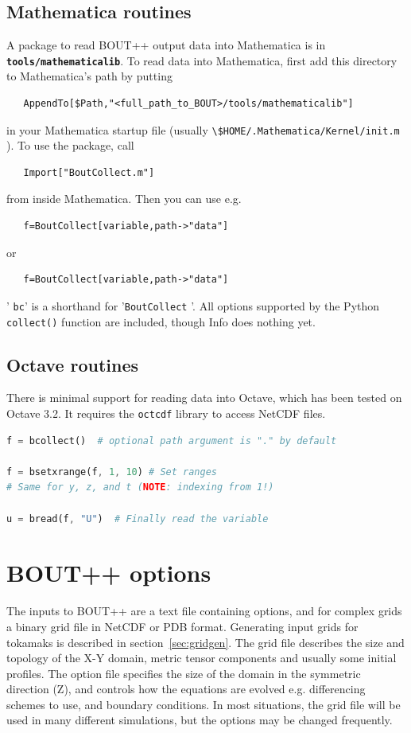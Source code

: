 \documentclass[12pt]{article}
\newcommand{\file}[1]{\texttt{\bf #1}}
\begin{document}
\subsection{Mathematica routines}
%
A package to read BOUT++ output data into Mathematica is in
\file{tools/mathematicalib}.  To read data into Mathematica, first add this
directory to Mathematica's path by putting
%
\begin{verbatim}
   AppendTo[$Path,"<full_path_to_BOUT>/tools/mathematicalib"]
\end{verbatim}
%
in your Mathematica startup file (usually
%
\lstinline!\$HOME/.Mathematica/Kernel/init.m!
%
). To use the package, call
%
\begin{verbatim}
   Import["BoutCollect.m"]
\end{verbatim}
%
from inside Mathematica. Then you can use e.g.
%
\begin{verbatim}
   f=BoutCollect[variable,path->"data"]
\end{verbatim}
%
or
%
\begin{verbatim}
   f=BoutCollect[variable,path->"data"]
\end{verbatim}
%
'
%
\lstinline!bc!' is a shorthand for '\lstinline!BoutCollect!
%
'. All options supported by the Python
%
\lstinline!collect()!
%
function are included, though Info does nothing yet.



\subsection{Octave routines}
%
There is minimal support for reading data into Octave, which has been tested on
Octave 3.2. It requires the \texttt{octcdf} library to access NetCDF files.

%
\begin{lstlisting}[language=octave,numbers=none]
f = bcollect()  # optional path argument is "." by default

f = bsetxrange(f, 1, 10) # Set ranges
# Same for y, z, and t (NOTE: indexing from 1!)

u = bread(f, "U")  # Finally read the variable
\end{lstlisting}
%





\section{BOUT++ options}
%
\label{sec:options}
%
%
The inputs to BOUT++ are a text file containing options, and for complex grids
a binary grid file in NetCDF or PDB format. Generating input grids for tokamaks
is described in section~\ref{sec:gridgen}. The grid file describes the size and
topology of the X-Y domain, metric tensor components and usually some initial
profiles. The option file specifies the size of the domain in the symmetric
direction (Z), and controls how the equations are evolved e.g. differencing
schemes to use, and boundary conditions.  In most situations, the grid file
will be used in many different simulations, but the options may be changed
frequently.
\end{document}
